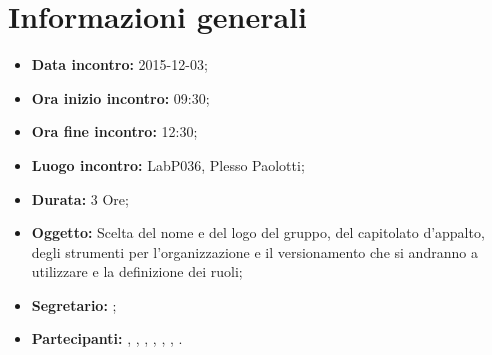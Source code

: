\newpage
\section{Informazioni generali}
\begin{itemize}
\item \textbf{Data incontro:} 2015-12-03;
\item \textbf{Ora inizio incontro:} 09:30;
\item \textbf{Ora fine incontro:} 12:30;
\item \textbf{Luogo incontro:} LabP036, Plesso Paolotti;
\item \textbf{Durata:} 3 Ore;
\item \textbf{Oggetto:} Scelta del nome e del logo del gruppo, del capitolato d'appalto, degli strumenti per l'organizzazione e il versionamento che si andranno a utilizzare e la definizione dei ruoli;
\item \textbf{Segretario:} \AF;
\item \textbf{Partecipanti:} \AF, \FB, \GN, \GR, \MV, \MP, \SM.

\end{itemize}
